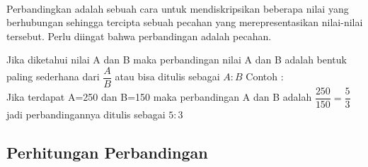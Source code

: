 \paragraph*{}
	Perbandingkan adalah sebuah cara untuk mendiskripsikan beberapa nilai yang berhubungan sehingga tercipta sebuah pecahan yang merepresentasikan nilai-nilai tersebut. Perlu diingat bahwa perbandingan adalah pecahan.
	\par
	Jika diketahui nilai A dan B maka perbandingan nilai A dan B adalah bentuk paling sederhana dari $\dfrac{A}{B}$ atau bisa ditulis sebagai $A:B$ Contoh :\\
	Jika terdapat A=250 dan B=150 maka perbandingan A dan B adalah $\dfrac{250}{150}=\dfrac{5}{3}$ jadi perbandingannya ditulis sebagai $5:3$
	\subsection{Perhitungan Perbandingan}
